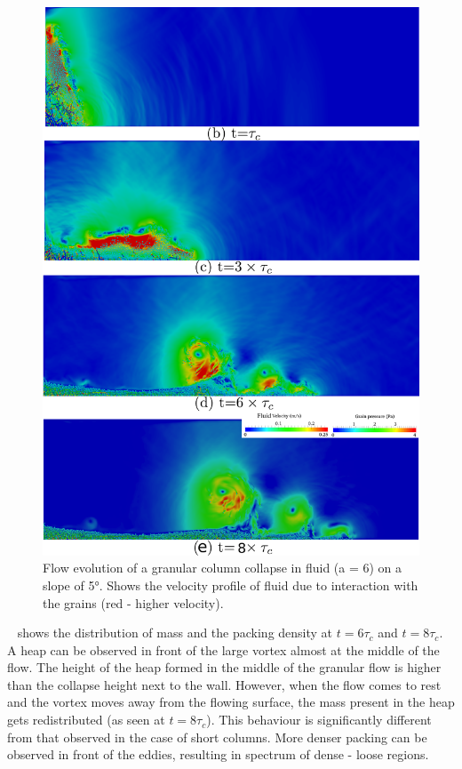 \documentclass[epj,twocolumn]{webofc}
\begin{document}
\begin{figure}[!h]
\centering
\includegraphics[width=0.9\linewidth]{figs/lbm_dem_a6_slope5}
\caption[Flow evolution of a granular column collapse in fluid (a = 6) on a 
slope of 5\si{\degree}]{Flow evolution of a granular column collapse in fluid 
(a = 6) on a slope of 5\si{\degree}. Shows the velocity profile of fluid due to 
interaction with the grains (red - higher velocity).}
\label{fig:a6_slope_snapshots}
\end{figure}

~ shows 
the distribution of mass and the packing density at $t = 6\tau_c$ and
$t = 8\tau_c$. A heap can be observed in front of the large vortex almost at the 
middle of the flow. The height of the heap formed in the middle of the granular 
flow is higher than the collapse height next to the wall. However, when the 
flow comes to rest and the vortex moves 
away from the flowing surface, the mass present in the heap gets redistributed 
(as seen at $t = 8\tau_c$). This behaviour is significantly different from that 
observed in the case of short columns. More denser packing can be observed in front
of the eddies, resulting in spectrum of dense - loose regions.
\end{document}
